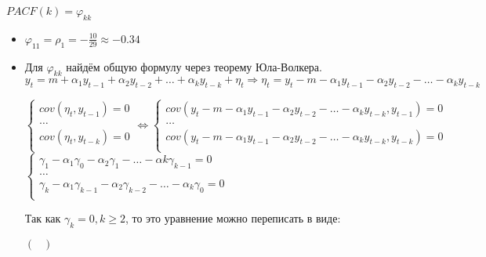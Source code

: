 \documentclass{article}
\begin{document}
\begin{enumerate}
\begin{enumerate}
    $PACF(k) = \varphi_{kk}$
    \begin{itemize}
        \item $\varphi_{11} = \rho_1 = -\frac{10}{29}\approx -0.34$
        \item Для $\varphi_{kk}$ найдём общую формулу через теорему Юла-Волкера. \\
        $y_t = m + \alpha_1 y_{t-1} + \alpha_2 y_{t-2} + \hdots + \alpha_k y_{t-k} + \eta_t \Rightarrow \eta_t = y_t - m - \alpha_1 y_{t-1} - \alpha_2 y_{t-2} - \hdots - \alpha_k y_{t-k}$
        \begin{center}
            \begin{math}
                \begin{cases}
                    cov(\eta_t, y_{t-1}) = 0 \\
                    \hdots \\
                    cov(\eta_t, y_{t-k}) = 0 \\
                \end{cases}
                \Leftrightarrow
                \begin{cases}
                    cov(y_t - m - \alpha_1 y_{t-1} - \alpha_2 y_{t-2} - \hdots - \alpha_k y_{t-k}, y_{t-1}) = 0 \\
                    \hdots \\
                    cov(y_t - m - \alpha_1 y_{t-1} - \alpha_2 y_{t-2} - \hdots - \alpha_k y_{t-k}, y_{t-k}) = 0 \\
                \end{cases}
            \end{math}
            \begin{math}
                \begin{cases}
                    \gamma_1 - \alpha_1\gamma_0 - \alpha_2\gamma_1 - \hdots - \alpha{k}\gamma_{k-1} = 0 \\
                    \hdots \\
                    \gamma_k - \alpha_1\gamma_{k-1} - \alpha_2\gamma_{k-2} - \hdots - \alpha_k\gamma_0 = 0 \\
                \end{cases}
            \end{math}
        \end{center}
        Так как $\gamma_k = 0, k \geq 2$, то это уравнение можно переписать в виде:
        \begin{center}
            \begin{math}
                \begin{pmatrix}

\end{pmatrix}
\end{math}
\end{center}
\end{itemize}
\end{enumerate}
\end{enumerate}
\end{document}
